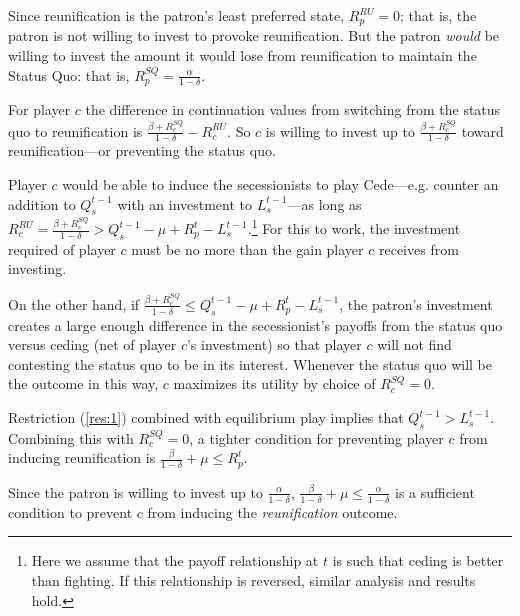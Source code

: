 \documentclass[11pt,letterpaper, notitlepage]{article}
\newcommand{\de}{\delta}
\begin{document}
Since reunification is the patron's least preferred state, $R_p^{RU} =0$; that is, the patron is not willing to invest to provoke reunification. But the patron \textit{would} be willing to invest the amount it would lose from reunification to maintain the Status Quo: that is, $R_p^{SQ} = \frac{\alpha}{1 -\de}$. 

For player $c$ the difference in continuation values from switching from the status quo to reunification is $\frac{\beta + R_c^{SQ}}{1 -\de} -R_c^{RU}$. So $c$ is willing to invest up to $\frac{\beta+ R_c^{SQ}}{1 -\de}$ toward reunification---or preventing the status quo.

Player $c$ would be able to induce the secessionists to play Cede---e.g. counter an addition to $Q_s^{t-1}$ with an investment to $L_s^{t-1}$---as long as $R_c^{RU} = \frac{\beta + R_c^{SQ}}{1 -\de} > Q_s^{t-1} -\mu + R_p^t - L_s^{t-1}$.\footnote{Here we assume that the payoff relationship at $t$ is such that ceding is better than fighting. If this relationship is reversed, similar analysis and results hold.} For this to work, the investment required of player $c$ must be no more than the gain player $c$ receives from investing.

On the other hand, if $\frac{\beta + R_c^{SQ}}{1 -\de} \leq Q_s^{t-1} -\mu + R_p^t - L_s^{t-1}$, the patron's investment creates a large enough difference in the secessionist's payoffs from the status quo versus ceding (net of player $c$'s investment) so that player $c$ will not find contesting the status quo to be in its interest. Whenever the status quo will be the outcome in this way, $c$ maximizes its utility by choice of $R_c^{SQ} =0$. 

Restriction (\ref{res:1}) combined with equilibrium play implies that  $Q_s^{t-1} > L_s^{t-1}$. Combining this with $R_c^{SQ} =0$, a tighter condition for preventing player $c$ from inducing reunification is $\frac{\beta}{1 -\de} + \mu \leq R_p^t$. 

Since the patron is willing to invest up to $\frac{\alpha}{1 -\de}$, $\frac{\beta}{1 -\de} + \mu \leq \frac{\alpha}{1 -\de}$ is a sufficient condition to prevent $c$ from inducing the \emph{reunification} outcome.
\end{document}
